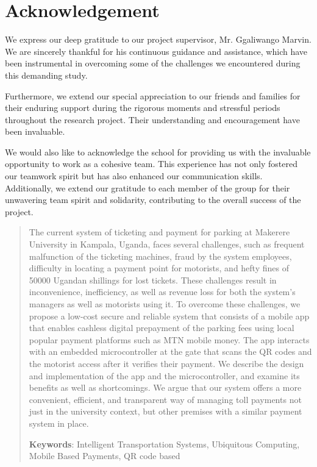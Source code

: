 \documentclass[14pt]{report}
\begin{document}
    \clearpage

    \section*{Acknowledgement}
    We express our deep gratitude to our project supervisor, Mr. Ggaliwango Marvin. We are sincerely thankful for his continuous guidance and assistance, which have been instrumental in overcoming some of the challenges we encountered during this demanding study.

    Furthermore, we extend our special appreciation to our friends and families for their enduring support during the rigorous moments and stressful periods throughout the research project. Their understanding and encouragement have been invaluable.

    We would also like to acknowledge the school for providing us with the invaluable opportunity to work as a cohesive team. This experience has not only fostered our teamwork spirit but has also enhanced our communication skills. Additionally, we extend our gratitude to each member of the group for their unwavering team spirit and solidarity, contributing to the overall success of the project.

    \begin{abstract}
        The current system of ticketing and payment for parking at Makerere University in Kampala, Uganda, faces several challenges, such as frequent malfunction of the ticketing machines, fraud by the system employees, difficulty in locating a payment point for motorists, and hefty fines of 50000 Ugandan shillings for lost tickets. These challenges result in inconvenience, inefficiency, as well as revenue loss for both the system’s managers as well as motorists using it. To overcome these challenges, we propose a low-cost secure and reliable system that consists of a mobile app that enables cashless digital prepayment of the parking fees using local popular payment platforms such as MTN mobile money. The app interacts with an embedded microcontroller at the gate that scans the QR codes and the motorist access after it verifies their payment. We describe the design and implementation of the app and the microcontroller, and examine its benefits as well as shortcomings. We argue that our system offers a more convenient, efficient, and transparent way of managing toll payments not just in the university context, but other premises with a similar payment system in place.

        \textbf{Keywords}: Intelligent Transportation Systems, Ubiquitous Computing, Mobile Based Payments, QR code based

    \end{abstract}
\end{document}
